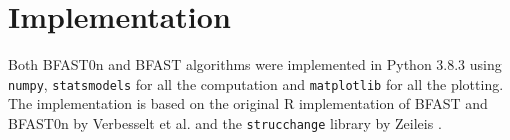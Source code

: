 \documentclass[main.tex]{subfiles}
\begin{document}
\chapter{Implementation}
\label{chap:implementation}
Both BFAST0n and BFAST algorithms were implemented in Python 3.8.3 using
\texttt{numpy}, \texttt{statsmodels}\cite{statsmodels} for all the computation
and \texttt{matplotlib} for all the plotting. The implementation is based on the
original R implementation of BFAST and BFAST0n by Verbesselt et al.
\cite{bfast-github} and the \texttt{strucchange} library by Zeileis
\cite{strucchange_code}.

\biblio
\end{document}
